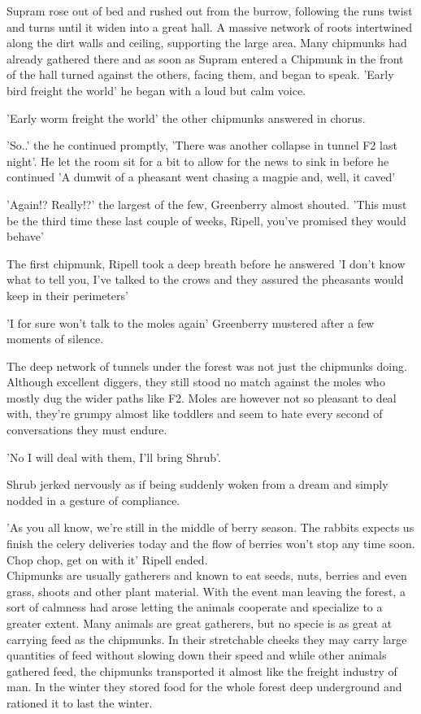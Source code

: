 \documentclass[smalldemyvopaper,11pt,twoside,onecolumn,openright,extrafontsizes]{memoir}
\begin{document}
Supram rose out of bed and rushed out from the burrow, following the runs twist and turns until it widen into a great hall. A massive network of roots intertwined along the dirt walls and ceiling, supporting the large area. Many chipmunks had already gathered there and as soon as Supram entered a Chipmunk in the front of the hall turned against the others, facing them, and began to speak. 
'Early bird freight the world' he began with a loud but calm voice. 

'Early worm freight the world' the other chipmunks answered in chorus.

'So..' the he continued promptly, 'There was another collapse in tunnel F2 last night'. He let the room sit for a bit to allow for the news to sink in before he continued 'A dumwit of a pheasant went chasing a magpie and, well, it caved'

'Again!? Really!?' the largest of the few, Greenberry almost shouted. 
'This must be the third time these last couple of weeks, Ripell, you've promised they would behave'

The first chipmunk, Ripell took a deep breath before he answered
'I don't know what to tell you, I've talked to the crows and they assured the pheasants would keep in their perimeters'

'I for sure won't talk to the moles again' Greenberry mustered after a few moments of silence.

The deep network of tunnels under the forest was not just the chipmunks doing. Although excellent diggers, they still stood no match against the moles who mostly dug the wider paths like F2. Moles are however not so pleasant to deal with, they're grumpy almost like toddlers and seem to hate every second of conversations they must endure. 

'No I will deal with them, I'll bring Shrub'. 

Shrub jerked nervously as if being suddenly woken from a dream and simply nodded in a gesture of compliance. 

'As you all know, we're still in the middle of berry season. The rabbits expects us finish the celery deliveries today and the flow of berries won't stop any time soon. Chop chop, get on with it' Ripell ended. \\

Chipmunks are usually gatherers and known to eat seeds, nuts, berries and even grass, shoots and other plant material. With the event man leaving the forest, a sort of calmness had arose letting the animals cooperate and specialize to a greater extent. Many animals are great gatherers, but no specie is as great at carrying feed as the chipmunks. In their stretchable cheeks they may carry large quantities of feed without slowing down their speed and while other animals gathered feed, the chipmunks transported it almost like the freight industry of man. In the winter they stored food for the whole forest deep underground and rationed it to last the winter. \\
\end{document}
